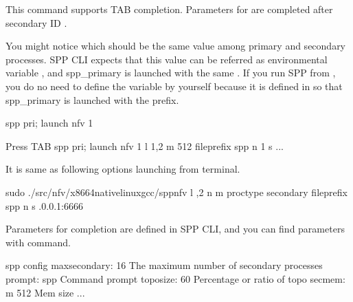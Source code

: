 \documentclass[a4paper,11pt,openany,oneside,english]{sphinxmanual}
\begin{document}
This  command supports TAB completion. Parameters for 
are completed after secondary ID .

You might notice  which should be the same value among
primary and secondary processes. SPP CLI expects that this value can be
referred as environmental variable , and spp\_primary is
launched with the same .
If you run SPP from , you do no need to define the variable
by yourself because it is defined in  so that spp\_primary is
launched with the prefix.

\begin{sphinxVerbatim}[commandchars=\\\{\},formatcom=\footnotesize]
spp \PYGZgt{} pri; launch nfv 1

\PYGZsh{} Press TAB
spp \PYGZgt{} pri; launch nfv 1 \PYGZhy{}l 1,2 \PYGZhy{}m 512 \PYGZhy{}\PYGZhy{}file\PYGZhy{}prefix spp \PYGZhy{}\PYGZhy{} \PYGZhy{}n 1 \PYGZhy{}s ...
\end{sphinxVerbatim}

It is same as following options launching from terminal.

\begin{sphinxVerbatim}[commandchars=\\\{\},formatcom=\footnotesize]
 sudo ./src/nfv/x86\PYGZus{}64\PYGZhy{}native\PYGZhy{}linux\PYGZhy{}gcc/spp\PYGZus{}nfv 
    \PYGZhy{}l ,2 \PYGZhy{}n  \PYGZhy{}m  
    \PYGZhy{}\PYGZhy{}proc\PYGZhy{}type secondary 
    \PYGZhy{}\PYGZhy{}file\PYGZhy{}prefix spp 
    \PYGZhy{}\PYGZhy{} 
    \PYGZhy{}n  
    \PYGZhy{}s .0.0.1:6666
\end{sphinxVerbatim}

Parameters for completion are defined in SPP CLI, and you can find
parameters with  command.

\begin{sphinxVerbatim}[commandchars=\\\{\},formatcom=\footnotesize]
spp \PYGZgt{} config
\PYGZhy{} max\PYGZus{}secondary: \PYGZdq{}16\PYGZdq{}   \PYGZsh{} The maximum number of secondary processes
\PYGZhy{} prompt: \PYGZdq{}spp \PYGZgt{} \PYGZdq{}  \PYGZsh{} Command prompt
\PYGZhy{} topo\PYGZus{}size: \PYGZdq{}60\PYGZpc{}\PYGZdq{}  \PYGZsh{} Percentage or ratio of topo
\PYGZhy{} sec\PYGZus{}mem: \PYGZdq{}\PYGZhy{}m 512\PYGZdq{} \PYGZsh{} Mem size
...
\end{sphinxVerbatim}
\end{document}
